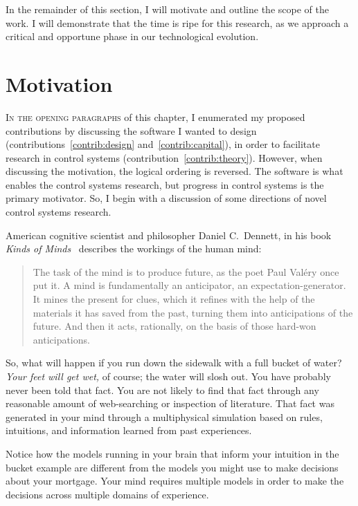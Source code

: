 In the remainder of this section, I will motivate and outline the scope of the
work. I will demonstrate that the time is ripe for this research, as we approach
a critical and opportune phase in our technological evolution.



\section{Motivation}%
\label{sec:motivation}


\textsc{In the opening paragraphs} of this chapter, I enumerated my proposed
contributions by discussing the software I wanted to design
(contributions~\ref{contrib:design} and~\ref{contrib:capital}), in order to
facilitate research in control systems (contribution~\ref{contrib:theory}).
However, when discussing the motivation, the logical ordering is reversed. The
software is what enables the control systems research, but progress in control
systems is the primary motivator. So, I begin with a discussion of some
directions of novel control systems research.

American cognitive scientist and philosopher Daniel C.\ Dennett, in his book
\emph{Kinds of Minds}~\cite{Dennett1997} describes the workings of the human
mind:
%
\begin{quote} The task of the mind is to produce future, as the poet Paul Valéry
once put it. A mind is fundamentally an anticipator, an expectation-generator.
It mines the present for clues, which it refines with the help of the materials
it has saved from the past, turning them into anticipations of the future. And
then it acts, rationally, on the basis of those hard-won anticipations.
\end{quote}

So, what will happen if you run down the sidewalk with a full bucket of water?
\emph{Your feet will get wet,} of course; the water will slosh out. You have probably never been told that fact. You are not
likely to find that fact through any reasonable amount of web-searching or
inspection of literature. That fact was generated in your mind through a
multiphysical simulation based on rules, intuitions, and information learned
from past experiences.

Notice how the models running in your brain that inform your intuition in the
bucket example are different from the models you might use to make decisions
about your mortgage. Your mind requires multiple models in order to make the
decisions across multiple domains of experience.

